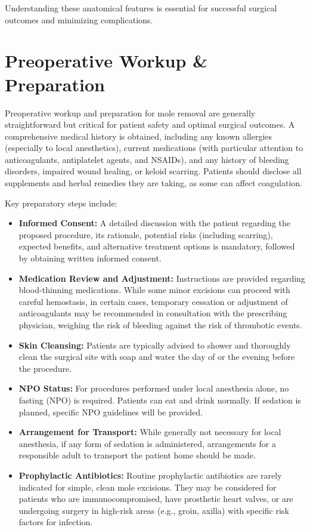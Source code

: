 Understanding these anatomical features is essential for successful surgical outcomes and minimizing complications.

\section*{Preoperative Workup \& Preparation}
Preoperative workup and preparation for mole removal are generally straightforward but critical for patient safety and optimal surgical outcomes. A comprehensive medical history is obtained, including any known allergies (especially to local anesthetics), current medications (with particular attention to anticoagulants, antiplatelet agents, and NSAIDs), and any history of bleeding disorders, impaired wound healing, or keloid scarring. Patients should disclose all supplements and herbal remedies they are taking, as some can affect coagulation.

Key preparatory steps include:

\begin{itemize}
  \item \textbf{Informed Consent:} A detailed discussion with the patient regarding the proposed procedure, its rationale, potential risks (including scarring), expected benefits, and alternative treatment options is mandatory, followed by obtaining written informed consent.
  
  \item \textbf{Medication Review and Adjustment:} Instructions are provided regarding blood-thinning medications. While some minor excisions can proceed with careful hemostasis, in certain cases, temporary cessation or adjustment of anticoagulants may be recommended in consultation with the prescribing physician, weighing the risk of bleeding against the risk of thrombotic events.
  
  \item \textbf{Skin Cleansing:} Patients are typically advised to shower and thoroughly clean the surgical site with soap and water the day of or the evening before the procedure.
  
  \item \textbf{NPO Status:} For procedures performed under local anesthesia alone, no fasting (NPO) is required. Patients can eat and drink normally. If sedation is planned, specific NPO guidelines will be provided.
  
  \item \textbf{Arrangement for Transport:} While generally not necessary for local anesthesia, if any form of sedation is administered, arrangements for a responsible adult to transport the patient home should be made.
  
  \item \textbf{Prophylactic Antibiotics:} Routine prophylactic antibiotics are rarely indicated for simple, clean mole excisions. They may be considered for patients who are immunocompromised, have prosthetic heart valves, or are undergoing surgery in high-risk areas (e.g., groin, axilla) with specific risk factors for infection.
\end{itemize}


